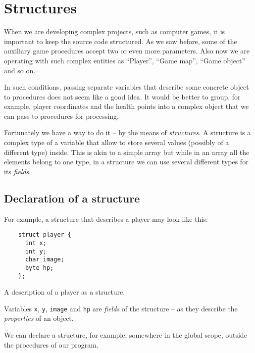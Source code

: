 \documentclass[../sparc.tex]{subfiles}
\begin{document}
\section{Structures}

When we are developing complex projects, such as computer games, it is important
to keep the source code structured.  As we saw before, some of the auxiliary
game procedures accept two or even more parameters.  Also now we are operating
with such complex entities as ``Player'', ``Game map'', ``Game object'' and so
on.

In such conditions, passing separate variables that describe some concrete
object to procedures does not seem like a good idea.  It would be better to
group, for example, player coordinates and the health points into a complex
object that we can pass to procedures for processing.

Fortunately we have a way to do it -- by the means of \emph{structures}.  A
structure is a complex type of a variable that allow to store several values
(possibly of a different type) inside.  This is akin to a simple array but while
in an array all the elements belong to one type, in a structure we can use
several different types for its \emph{fields}.

\subsection{Declaration of a structure}

For example, a structure that describes a player may look like this:

\begin{listing}[H]
  \begin{verbatim}
    struct player {
      int x;
      int y;
      char image;
      byte hp;
    };
  \end{verbatim}
  \caption{A description of a player as a structure.}
  \label{listing:game-dev-structure}
\end{listing}

Variables \texttt{x}, \texttt{y}, \texttt{image} and
\texttt{hp} are \emph{fields} of the structure -- as they describe the
\emph{properties} of an object.

We can declare a structure, for example, somewhere in the global scope, outside
the procedures of our program.
\end{document}
